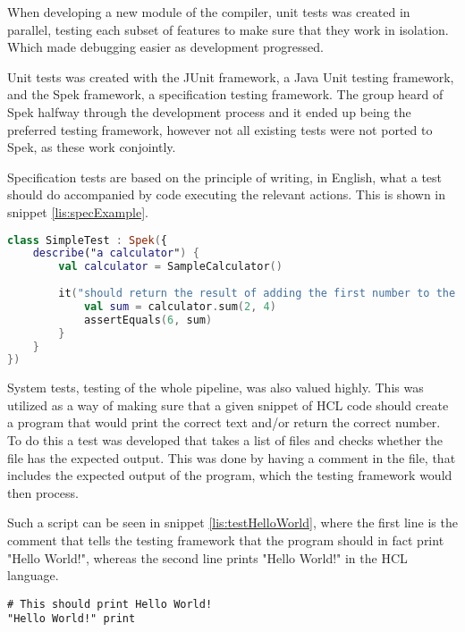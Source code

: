 When developing a new module of the compiler, unit tests was created in parallel, testing each subset of features to make sure that they work in isolation. 
Which made debugging easier as development progressed.


Unit tests was created with the JUnit\cite{JUnit} framework, a Java Unit testing framework, and the Spek\cite{SpekFramework} framework, a specification testing framework. 
The group heard of Spek halfway through the development process and it ended up being the preferred testing framework, however not all existing tests were not ported to Spek, as these work conjointly.

Specification tests are based on the principle of writing, in English, what a test should do accompanied by code executing the relevant actions.
This is shown in snippet \ref{lis:specExample}.


\begin{lstlisting}[language=Kotlin,label={lis:specExample},caption={An sample unit tests with spec}]
class SimpleTest : Spek({
	describe("a calculator") {
		val calculator = SampleCalculator()
		
		it("should return the result of adding the first number to the second number") {
			val sum = calculator.sum(2, 4)
			assertEquals(6, sum)
		}
	}
})
\end{lstlisting}

System tests, testing of the whole pipeline, was also valued highly.
This was utilized as a way of making sure that a given snippet of HCL code should create a program that would print the correct text and/or return the correct number.
To do this a test was developed that takes a list of files and checks whether the file has the expected output.
This was done by having a comment in the file, that includes the expected output of the program, which the testing framework would then process. 


Such a script can be seen in snippet \ref{lis:testHelloWorld}, where the first line is the comment that tells the testing framework that the program should in fact print "Hello World!", whereas the second line prints "Hello World!" in the HCL language.
\begin{lstlisting}[language=HCL,label=lis:testHelloWorld,firstnumber=1,caption={A HCL test-script as part of the testing framework}]
# This should print Hello World!
"Hello World!" print
\end{lstlisting}


